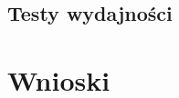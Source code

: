 \documentclass[a4paper,11pt,twoside]{report}
\theoremstyle{definition}
\begin{document}
\section*{Testy wydajności}

\chapter{Wnioski}

\begin{thebibliography}{20}%


\end{thebibliography}
\end{document}
